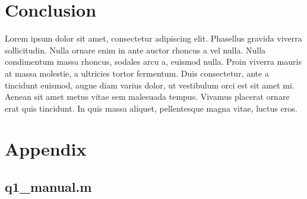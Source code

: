\documentclass[a4paper, 10pt, conference]{ieeeconf}
\begin{document}
\section{Conclusion}
Lorem ipsum dolor sit amet, consectetur adipiscing elit. Phasellus gravida viverra sollicitudin. Nulla ornare enim in ante auctor rhoncus a vel nulla. Nulla condimentum massa rhoncus, sodales arcu a, euismod nulla. Proin viverra mauris at massa molestie, a ultricies tortor fermentum. Duis consectetur, ante a tincidunt euismod, augue diam varius dolor, ut vestibulum orci est sit amet mi. Aenean sit amet metus vitae sem malesuada tempus. Vivamus placerat ornare erat quis tincidunt. In quis massa aliquet, pellentesque magna vitae, luctus eros.




\onecolumn
\section*{Appendix}

\subsection*{q1\_manual.m}

\newpage
\end{document}
